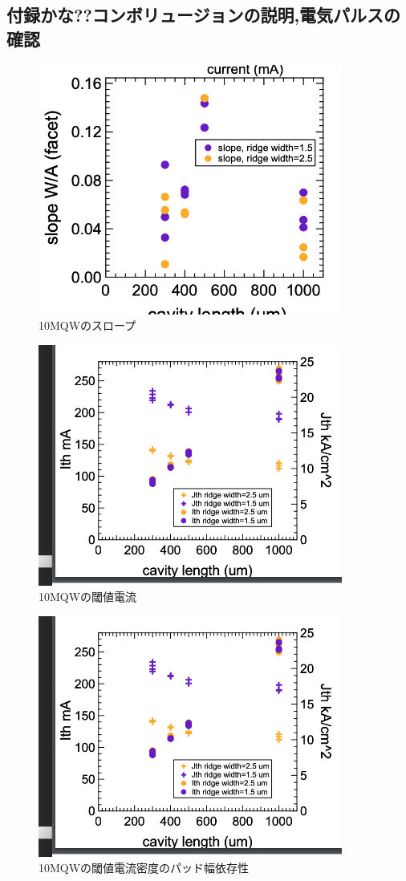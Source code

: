 \subsection{付録かな??コンボリュージョンの説明,電気パルスの確認}%

\begin{figure}[h]
	\centering
	\includegraphics[width=10cm]{figure/fig_3_1_broad_slope_10QW.png}
		\caption{10MQWのスロープ}
		\label{fig_3_1_IL_broad_slope}
\end{figure}

\begin{figure}[h]
	\centering
	\includegraphics[width=10cm]{figure/fig_3_1_broad_i_th_10QW.png}
		\caption{10MQWの閾値電流}
		\label{fig_3_1_broad_i_th_3QW}
\end{figure}


\begin{figure}[h]
	\centering
	\includegraphics[width=10cm]{figure/fig_3_1_broad_i_th_10QW.png}
		\caption{10MQWの閾値電流密度のパッド幅依存性}
		\label{fig_3_1_broad_j_th_10QW}
\end{figure}
